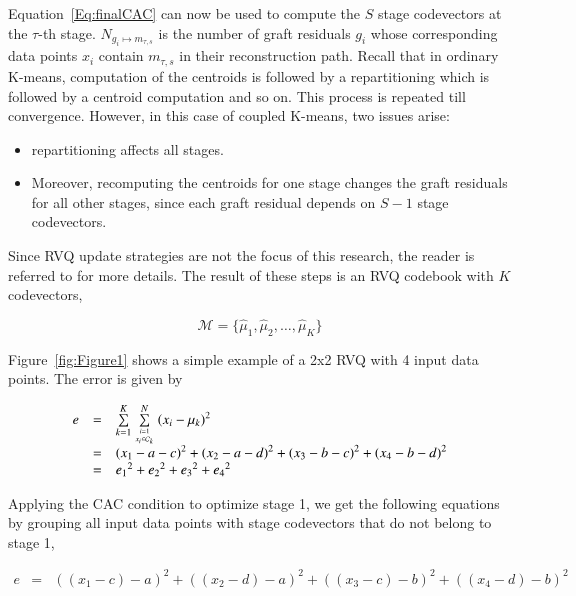 \begin{Body}
Equation~\ref{Eq:finalCAC} can now be used to compute the $S$ stage codevectors at the $\tau$-th stage.  $N_{g_i \mapsto m_{\tau, s}}$ is the number of graft residuals $g_i$ whose corresponding data points $x_i$ contain $m_{\tau, s}$ in their reconstruction path.  Recall that in ordinary K-means, computation of the centroids is followed by a repartitioning which is followed by a centroid computation and so on.  This process is repeated till convergence.  However, in this case of coupled K-means, two issues arise:

\begin{itemize}
\item repartitioning affects all stages.  
\item Moreover, recomputing the centroids for one stage changes the graft residuals for all other stages, since each graft residual depends on $S-1$ stage codevectors.  
\end{itemize}

Since RVQ update strategies are not the focus of this research, the reader is referred to  \cite{1996_JNL_AdvancesRVQ_Barnes} for more details.  The result of these steps is an RVQ codebook with $K$ codevectors,

\begin{equation}
\mathcal{M} = \{\hat{\mu}_1, \hat{\mu}_2, \ldots, \hat{\mu}_K\}
\end{equation}

Figure~\ref{fig:Figure1} shows a simple example of a 2x2 RVQ with 4 input data points.  The error is given by



\begin{equation}
\begin{array}{lllll}
e &=& \sum\limits_{k=1}^K \sum\limits_{{i=1 \atop x_i \in \mathcal{C}_k}}^N {(x_i - \mu_k)}^2 \\
&=& {(x_1 - a - c)}^2 + {(x_2- a - d)}^2 + {(x_3 - b - c)}^2 + {(x_4 - b - d)}^2\\
&=& {e_1}^2 + {e_2}^2 + {e_3}^2 + {e_4}^2
\end{array}
\end{equation}

Applying the CAC condition to optimize stage 1, we get the following equations by grouping all input data points with stage codevectors that do not belong to stage 1,

\begin{equation}
\begin{array}{lllll}
e &=& {((x_1 - c) - a)}^2 + {((x_2- d) - a)}^2 + {((x_3 - c) - b)}^2 + {((x_4 - d) - b)}^2
\end{array}
\label{Eqn:2x2RVQ_stage1}
\end{equation}


\end{Body}
